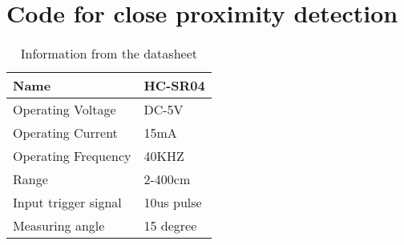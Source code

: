 \section{Code for close proximity detection}


\begin{table}[H]
\centering
\begin{tabular}{|l|l|}
\hline
\textbf{Name}        & \textbf{HC-SR04} \\ \hline
Operating Voltage    & DC-5V                              \\ \hline
Operating Current    & 15mA                               \\ \hline
Operating Frequency  & 40KHZ                              \\ \hline
Range                & 2-400cm                            \\ \hline
Input trigger signal & 10us pulse                         \\ \hline
Measuring angle      & 15 degree                          \\ \hline
\end{tabular}
\caption{Information from the datasheet\cite{hcsr40datesheet}}
\end{table}
